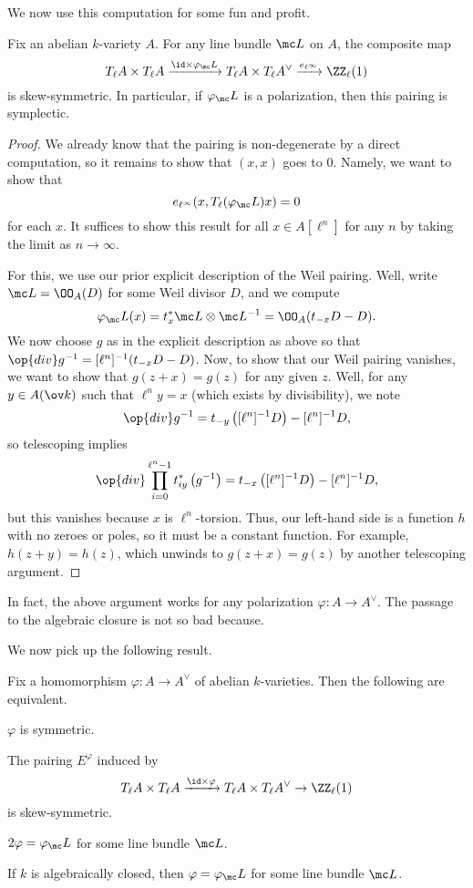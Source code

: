 \documentclass[../notes.tex]{subfiles}
\begin{document}
We now use this computation for some fun and profit.
\begin{proposition}
	Fix an abelian $k$-variety $A$. For any line bundle $\mc L$ on $A$, the composite map
	\[T_\ell A\times T_\ell A\xrightarrow{{\id}\times\varphi_\mc L}T_\ell A\times T_\ell A^\lor\xrightarrow{e_{\ell^\infty}}\ZZ_\ell(1)\]
	is skew-symmetric. In particular, if $\varphi_\mc L$ is a polarization, then this pairing is symplectic.
\end{proposition}
\begin{proof}
	We already know that the pairing is non-degenerate by a direct computation, so it remains to show that $(x,x)$ goes to $0$. Namely, we want to show that
	\[e_{\ell^\infty}(x,T_\ell(\varphi_\mc L)x)=0\]
	for each $x$. It suffices to show this result for all $x\in A[\ell^n]$ for any $n$ by taking the limit as $n\to\infty$.

	For this, we use our prior explicit description of the Weil pairing. Well, write $\mc L=\OO_A(D)$ for some Weil divisor $D$, and we compute
	\[\varphi_\mc L(x)=t_x^*\mc L\otimes\mc L^{-1}=\OO_A(t_{-x}D-D).\]
	We now choose $g$ as in the explicit description as above so that $\op{div}g^{-1}=[\ell^n]^{-1}(t_{-x}D-D)$. Now, to show that our Weil pairing vanishes, we want to show that $g(z+x)=g(z)$ for any given $z$. Well, for any $y\in A(\ov k)$ such that $\ell^ny=x$ (which exists by divisibility), we note
	\[\op{div}g^{-1}=t_{-y}\left([\ell^n]^{-1}D\right)-[\ell^n]^{-1}D,\]
	so telescoping implies
	\[\op{div}\prod_{i=0}^{\ell^n-1}t_{iy}^*\left(g^{-1}\right)=t_{-x}\left([\ell^n]^{-1}D\right)-[\ell^n]^{-1}D,\]
	but this vanishes because $x$ is $\ell^n$-torsion. Thus, our left-hand side is a function $h$ with no zeroes or poles, so it must be a constant function. For example, $h(z+y)=h(z)$, which unwinds to $g(z+x)=g(z)$ by another telescoping argument.
\end{proof}
\begin{remark}
	In fact, the above argument works for any polarization $\varphi\colon A\to A^\lor$. The passage to the algebraic closure is not so bad because.
\end{remark}
We now pick up the following result.
\begin{theorem}
	Fix a homomorphism $\varphi\colon A\to A^\lor$ of abelian $k$-varieties. Then the following are equivalent.
	\begin{listroman}
		\item $\varphi$ is symmetric.
		\item The pairing $E^\varphi$ induced by
		\[T_\ell A\times T_\ell A\xrightarrow{{\id}\times\varphi}T_\ell A\times T_\ell A^\lor\to\ZZ_\ell(1)\]
		is skew-symmetric.
		\item $2\varphi=\varphi_\mc L$ for some line bundle $\mc L$.
		\item If $k$ is algebraically closed, then $\varphi=\varphi_\mc L$ for some line bundle $\mc L$.
	\end{listroman}
\end{theorem}
\end{document}
